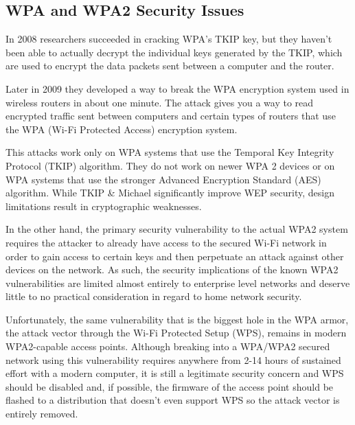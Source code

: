 \documentclass[a4paper,12pt,pagesize,headsepline,bibtotoc,titlepage]{scrartcl}
\begin{document}
\subsection{WPA and WPA2 Security Issues}

In 2008 researchers succeeded in cracking WPA's TKIP key, but they haven't been able to actually decrypt the individual keys generated by the TKIP, which are used to encrypt the data packets sent between a computer and the router. 

Later in 2009 they developed a way to break the WPA encryption system used in wireless routers in about one minute. The attack gives you a way to read encrypted traffic sent between computers and certain types of routers that use the WPA (Wi-Fi Protected Access) encryption system.

This attacks work only on WPA systems that use the Temporal Key Integrity Protocol (TKIP) algorithm. They do not work on newer WPA 2 devices or on WPA systems that use the stronger Advanced Encryption Standard (AES) algorithm. While TKIP \& Michael significantly improve WEP security, design limitations result in cryptographic weaknesses.

In the other hand, the primary security vulnerability to the actual WPA2 system requires the attacker to already have access to the secured Wi-Fi network in order to gain access to certain keys and then perpetuate an attack against other devices on the network. As such, the security implications of the known WPA2 vulnerabilities are limited almost entirely to enterprise level networks and deserve little to no practical consideration in regard to home network security.

Unfortunately, the same vulnerability that is the biggest hole in the WPA armor, the attack vector through the Wi-Fi Protected Setup (WPS), remains in modern WPA2-capable access points. Although breaking into a WPA/WPA2 secured network using this vulnerability requires anywhere from 2-14 hours of sustained effort with a modern computer, it is still a legitimate security concern and WPS should be disabled and, if possible, the firmware of the access point should be flashed to a distribution that doesn’t even support WPS so the attack vector is entirely removed.







\newpage
\end{document}

